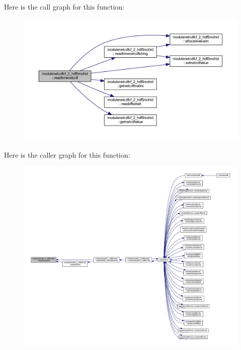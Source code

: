 Here is the call graph for this function\+:\nopagebreak
\begin{figure}[H]
\begin{center}
\leavevmode
\includegraphics[width=350pt]{namespacemodulenetcdfcf__2__hdf5mohid_a734d453ab8aa9e07adc4f367336f1875_cgraph}
\end{center}
\end{figure}
Here is the caller graph for this function\+:\nopagebreak
\begin{figure}[H]
\begin{center}
\leavevmode
\includegraphics[width=350pt]{namespacemodulenetcdfcf__2__hdf5mohid_a734d453ab8aa9e07adc4f367336f1875_icgraph}
\end{center}
\end{figure}
\mbox{\label{namespacemodulenetcdfcf__2__hdf5mohid_a3208523531a4e193ad1b485436dad44a}} 
